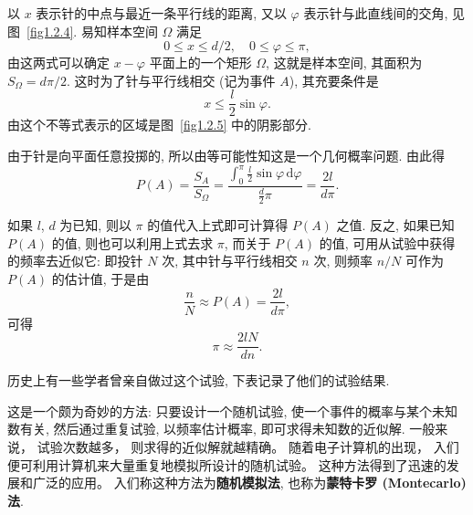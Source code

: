 \begin{solution}
    以 $x$ 表示针的中点与最近一条平行线的距离,
    又以 $\varphi$ 表示针与此直线间的交角,
    见图~\ref{fig1.2.4}.
    易知样本空间 $\Omega$ 满足
    \[
        0 \le x \le d/2, \quad 0 \le \varphi \le \pi,
    \]
    由这两式可以确定 $x - \varphi$ 平面上的一个矩形 $\Omega$,
    这就是样本空间,
    其面积为 $S_\Omega = d\pi/2$.
    这时为了针与平行线相交 (记为事件 $A$),
    其充要条件是
    \[
        x \le \frac{l}{2} \sin \varphi.
    \]
    由这个不等式表示的区域是图~\ref{fig1.2.5} 中的阴影部分.

    由于针是向平面任意投掷的,
    所以由等可能性知这是一个几何概率问题.
    由此得
    \[
        P (A) = \frac{S_A}{S_\Omega}
        = \frac{\int_0^\pi \frac{l}{2} \sin \varphi \, \mathrm{d} \varphi}{\frac{d}{2} \pi}
        = \frac{2l}{d\pi}.
    \]

    如果 $l$, $d$ 为已知,
    则以 $\pi$ 的值代入上式即可计算得 $P(A)$ 之值.
    反之,
    如果已知 $P(A)$ 的值,
    则也可以利用上式去求 $\pi$,
    而关于 $P(A)$ 的值,
    可用从试验中获得的频率去近似它:
    即投针 $N$ 次,
    其中针与平行线相交 $n$ 次,
    则频率 $n/N$ 可作为 $P(A)$ 的估计值,
    于是由
    \[
        \frac{n}{N} \approx P (A) = \frac{2l}{d\pi},
    \]
    可得
    \[
        \pi \approx \frac{2lN}{dn}.
    \]

    历史上有一些学者曾亲自做过这个试验,
    下表记录了他们的试验结果.



    这是一个颇为奇妙的方法:
    只要设计一个随机试验,
    使一个事件的概率与某个未知数有关,
    然后通过重复试验,
    以频率估计概率,
    即可求得未知数的近似解.
    一般来说，
    试验次数越多，
    则求得的近似解就越精确。
    随着电子计算机的出现，
    入们便可利用计算机来大量重复地模拟所设计的随机试验。
    这种方法得到了迅速的发展和广泛的应用。
    入们称这种方法为\textbf{随机模拟法},
    也称为\textbf{蒙特卡罗 (Montecarlo) 法}.
\end{solution}

